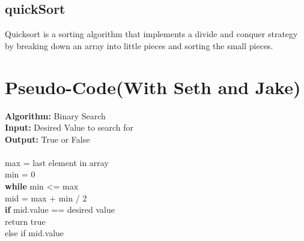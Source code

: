 \documentclass[10pt,letterpaper]{article}
\begin{document}
	\subsection*{quickSort}
		Quicksort is a sorting algorithm that implements a divide and conquer strategy by breaking down an array into little pieces and sorting the small pieces.
		
\section{Pseudo-Code(With Seth and Jake)}
\textbf{Algorithm:} Binary Search\\
\textbf{Input:} Desired Value to search for\\
\textbf{Output:} True or False\\
\\
max = last element in array\\
min = 0\\
\textbf{while} min <= max\\
     mid = max + min / 2\\
	\textbf{if} mid.value == desired value\\
	return true\\
	else if mid.value
	
\end{document}
